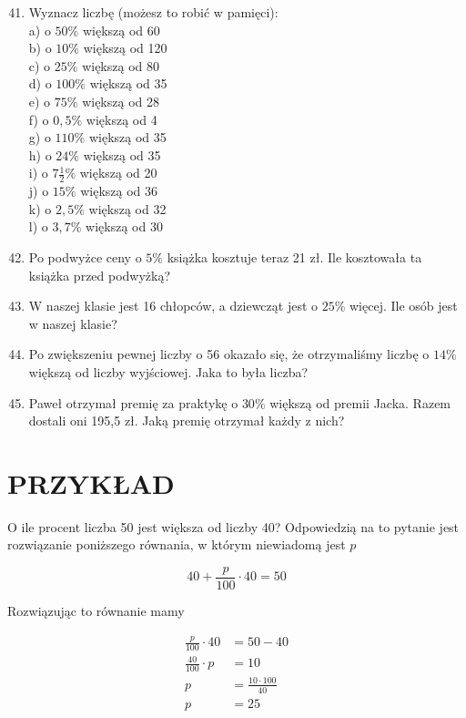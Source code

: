 \documentclass[10pt]{article}
\begin{document}
\begin{enumerate}
  \setcounter{enumi}{40}
  \item Wyznacz liczbę (możesz to robić w pamięci):\\
a) o \(50 \%\) większą od 60\\
b) o \(10 \%\) większą od 120\\
c) o \(25 \%\) większą od 80\\
d) o \(100 \%\) większą od 35\\
e) o \(75 \%\) większą od 28\\
f) o \(0,5 \%\) większą od 4\\
g) o \(110 \%\) większą od 35\\
h) o \(24 \%\) większą od 35\\
i) o \(7 \frac{1}{2} \%\) większą od 20\\
j) o \(15 \%\) większą od 36\\
k) o \(2,5 \%\) większą od 32\\
l) o \(3,7 \%\) większą od 30
  \item Po podwyżce ceny o \(5 \%\) książka kosztuje teraz 21 zł. Ile kosztowała ta książka przed podwyżką?
  \item W naszej klasie jest 16 chłopców, a dziewcząt jest o \(25 \%\) więcej. Ile osób jest w naszej klasie?
  \item Po zwiększeniu pewnej liczby o 56 okazało się, że otrzymaliśmy liczbę o \(14 \%\) większą od liczby wyjściowej. Jaka to była liczba?
  \item Paweł otrzymał premię za praktykę o \(30 \%\) większą od premii Jacka. Razem dostali oni 195,5 zł. Jaką premię otrzymał każdy z nich?
\end{enumerate}

\section*{PRZYKŁAD}
O ile procent liczba 50 jest większa od liczby 40? Odpowiedzią na to pytanie jest rozwiązanie poniższego równania, w którym niewiadomą jest \(p\)

\[
40+\frac{p}{100} \cdot 40=50
\]

Rozwiązując to równanie mamy

\[
\begin{aligned}
\frac{p}{100} \cdot 40 & =50-40 \\
\frac{40}{100} \cdot p & =10 \\
p & =\frac{10 \cdot 100}{40} \\
p & =25
\end{aligned}
\]
\end{document}
